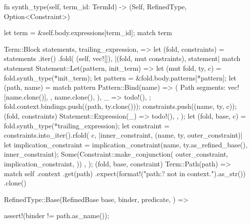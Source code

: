\documentclass[
  oneside,
  english,
  coorientadorbanca,
  noabntexcite
]{ufsc-thesis-rn46-2019}
\begin{document}
\begin{rustcode}
{    fn synth_type(self, term_id: TermId) -> (Self, RefinedType, Option<Constraint>) {
        let term = &self.body.expressions[term_id];
        match term {
            Term::Block {
                statements,
                trailing_expression,
            } => {
                let (fold, constraints) =
                    statements
                        .iter()
                        .fold(
                            (self, vec![]),
                            |(fold, mut constraints), statement| match statement {
                                Statement::Let(pattern, init_term) => {
                                    let (mut fold, ty, c) = fold.synth_type(*init_term);
                                    let pattern = &fold.body.patterns[*pattern];
                                    let (path, name) = match pattern {
                                        Pattern::Bind(name) => (
                                            Path {
                                                segments: vec![name.clone()],
                                            },
                                            name.clone(),
                                        ),
                                        _ => todo!(),
                                    };
                                    fold.context.bindings.push((path, ty.clone()));
                                    constraints.push((name, ty, c));
                                    (fold, constraints)
                                }
                                Statement::Expression(_) => todo!(),
                            },
                        );
                let (fold, base, c) = fold.synth_type(*trailing_expression);
                let constraint = constraints.into_iter().rfold(
                    c,
                    |inner_constraint, (name, ty, outer_constraint)| {
                        let implication_constraint =
                            implication_constraint(name, ty.as_refined_base(), inner_constraint);
                        Some(Constraint::make_conjunction(
                            outer_constraint,
                            implication_constraint,
                        ))
                    },
                );
                (fold, base, constraint)
            }
            Term::Path(path) => match self
                .context
                .get(path)
                .expect(format!("{path:?} not in context.").as_str())
                .clone()
            {
                RefinedType::Base(RefinedBase {
                    base,
                    binder,
                    predicate,
                }) => {
                    assert!(binder != path.as_name());

}}}}}
\end{rustcode}
\end{document}
